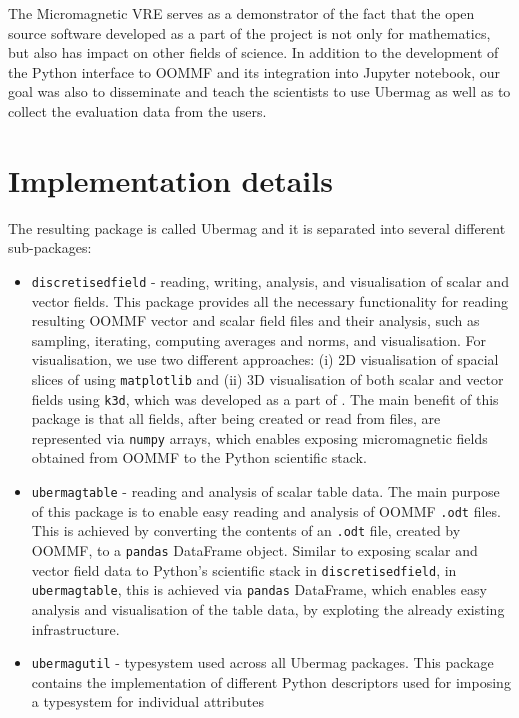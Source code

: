 \documentclass{deliverablereport}
\begin{document}
The Micromagnetic VRE serves as a demonstrator of the fact
that the open source software developed as a part of the \ODK project
is not only for mathematics, but also has impact on other fields of
science. In addition to the development of the Python interface to
OOMMF and its integration into Jupyter notebook, our goal was also to
disseminate and teach the scientists to use Ubermag as well as to
collect the evaluation data from the users.

\section{Implementation details}

The resulting package is called Ubermag and it is separated into
several different sub-packages:

\begin{itemize}
\item \texttt{discretisedfield} - reading, writing, analysis, and
visualisation of scalar and vector fields. This package provides all
the necessary functionality for reading resulting OOMMF vector and
scalar field files and their analysis, such as sampling, iterating,
computing averages and norms, and visualisation. For visualisation, we
use two different approaches: (i) 2D visualisation of spacial slices
of using \texttt{matplotlib} and (ii) 3D visualisation of both scalar
and vector fields using \texttt{k3d}, which was developed as a part of
\ODK. The main benefit of this package is that all fields, after being
created or read from files, are represented via \texttt{numpy} arrays,
which enables exposing micromagnetic fields obtained from OOMMF to the
Python scientific stack.
\item \texttt{ubermagtable} - reading and analysis of scalar table
data. The main purpose of this package is to enable easy reading and
analysis of OOMMF \texttt{.odt} files. This is achieved by converting
the contents of an \texttt{.odt} file, created by OOMMF, to a
\texttt{pandas} DataFrame object. Similar to exposing scalar and
vector field data to Python's scientific stack in
\texttt{discretisedfield}, in \texttt{ubermagtable}, this is achieved
via \texttt{pandas} DataFrame, which enables easy analysis and
visualisation of the table data, by exploting the already existing
infrastructure.
\item \texttt{ubermagutil} - typesystem used across all Ubermag
packages. This package contains the implementation of different Python
descriptors used for imposing a typesystem for individual attributes

\end{itemize}
\end{document}

